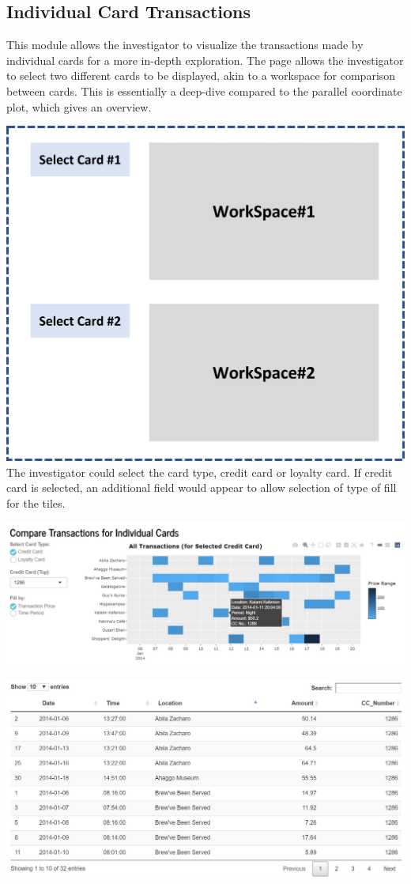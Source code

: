 \documentclass{acm_proc_article-sp}
\begin{document}
\hypertarget{individual-card-transactions}{%
\subsection{Individual Card
Transactions}\label{individual-card-transactions}}

This module allows the investigator to visualize the transactions made
by individual cards for a more in-depth exploration. The page allows the
investigator to select two different cards to be displayed, akin to a
workspace for comparison between cards. This is essentially a deep-dive
compared to the parallel coordinate plot, which gives an overview.

\includegraphics{img/P06WorkSpace.png} The investigator could select the
card type, credit card or loyalty card. If credit card is selected, an
additional field would appear to allow selection of type of fill for the
tiles.

\includegraphics{img/P02SpecCard.jpg}

\includegraphics{img/P05SpecCardTable.jpg}
\end{document}
